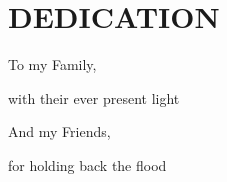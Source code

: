 
\chapter*{DEDICATION}\label{dedication}
\vspace{7mm}

\begin{center}

\vspace{60mm}



To my Family,

\vspace{7mm}

with their ever present light

\vspace{7mm}

And my Friends,

\vspace{7mm}

for holding back the flood


    
\end{center}
